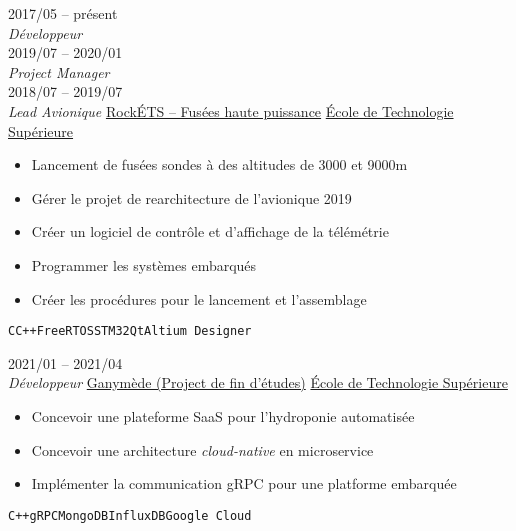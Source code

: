 \documentclass[9pt]{developercv} %
\begin{document}
\begin{minipage}[t]{0.8\textwidth}


\begin{entrylist}
	\entry
		{2017/05 -- présent\\{\small\emph{Développeur}}\\2019/07 -- 2020/01\\{\small\emph{Project Manager}}\\2018/07 -- 2019/07\\{\small\emph{Lead Avionique}}}
		{\href{https://clubrockets.ca/}{RockÉTS -- Fusées haute puissance}}
		{\href{https://clubrockets.ca/}{École de Technologie Supérieure}}
		{
			\vspace{-14pt}
			\begin{itemize}
				\renewcommand{\labelitemi}{\raisebox{.45ex}{\rule{.6ex}{.6ex}}}
				\setlength\itemsep{-1pt}
				\item Lancement de fusées sondes à des altitudes de 3000 et 9000m
				\item Gérer le projet de rearchitecture de l'avionique 2019
				\item Créer un logiciel de contrôle et d'affichage de la télémétrie
				\item Programmer les systèmes embarqués
				\item Créer les procédures pour le lancement et l'assemblage
			\end{itemize}
			\vspace{-4pt}
			\texttt{C}\slashsep\texttt{C++}\slashsep\texttt{FreeRTOS}\slashsep\texttt{STM32}\slashsep\texttt{Qt}\slashsep\texttt{Altium Designer}
		}
	\entry
		{2021/01 -- 2021/04\\{\small\emph{Développeur}}}
		{\href{https://github.com/ngc7293/ganymede}{Ganymède (Project de fin d'études)}}
		{\href{}{École de Technologie Supérieure}}
		{
			\vspace{-14pt}
			\begin{itemize}
				\renewcommand{\labelitemi}{\raisebox{.45ex}{\rule{.6ex}{.6ex}}}
				\setlength\itemsep{-1pt}
				\item Concevoir une plateforme SaaS pour l'hydroponie automatisée
				\item Concevoir une architecture \emph{cloud-native} en microservice
				\item Implémenter la communication gRPC pour une platforme embarquée
			\end{itemize}
			\vspace{-4pt}
			\texttt{C++}\slashsep\texttt{gRPC}\slashsep\texttt{MongoDB}\slashsep\texttt{InfluxDB}\slashsep\texttt{Google Cloud}
		}
\end{entrylist}


\end{minipage}
\end{document}
